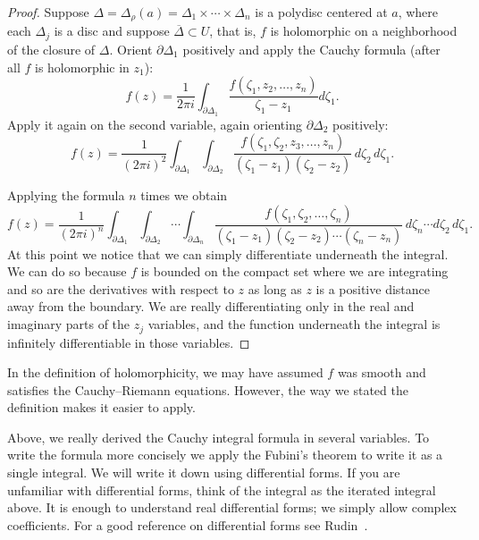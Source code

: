 \documentclass[12pt,openany]{book}
\theoremstyle{plain}
\theoremstyle{remark}
\theoremstyle{definition}
\theoremstyle{exercise}
\theoremstyle{example}
\begin{document}
\begin{proof}
Suppose $\Delta = \Delta_{\rho}(a) = \Delta_1 \times \cdots \times \Delta_n$
is a polydisc centered at $a$, where each $\Delta_j$ is a disc
and suppose $\overline{\Delta} \subset U$, that is, $f$ is holomorphic
on a neighborhood of the closure of $\Delta$.
Orient $\partial \Delta_1$ positively and
apply the Cauchy formula (after all $f$ is holomorphic in $z_1$):
\begin{equation*}
f(z) =
\frac{1}{2\pi i}
\int_{\partial \Delta_1}
\frac{f(\zeta_1,z_2,\ldots,z_n)}{\zeta_1-z_1}
d \zeta_1 .
\end{equation*}
Apply it again on the second variable, again orienting
$\partial \Delta_2$ positively:
\begin{equation*}
f(z) =
\frac{1}{{(2\pi i)}^2}
\int_{\partial \Delta_1}
\int_{\partial \Delta_2}
\frac{f(\zeta_1,\zeta_2,z_3,\ldots,z_n)}{(\zeta_1-z_1)(\zeta_2-z_2)}
\,
d \zeta_2
\,
d \zeta_1 .
\end{equation*}

Applying the formula $n$ times we obtain
\begin{equation*}
f(z) =
\frac{1}{{(2\pi i)}^n}
\int_{\partial \Delta_1}
\int_{\partial \Delta_2}
\cdots
\int_{\partial \Delta_n}
\frac{f(\zeta_1,\zeta_2,\ldots,\zeta_n)}{(\zeta_1-z_1)(\zeta_2-z_2)\cdots(\zeta_n-z_n)}
\,
d \zeta_n
\cdots
d \zeta_2
\,
d \zeta_1 .
\end{equation*}
At this point we notice that we can simply differentiate underneath the
integral.  We can do so because $f$ is bounded on the compact set where we
are integrating and so are the derivatives with respect to $z$ as long as
$z$ is a positive distance away from the boundary.
We are really differentiating only in the real and imaginary
parts of the $z_j$ variables, and the function underneath the integral is
infinitely differentiable in those variables.
\end{proof}

In the definition of holomorphicity,
we may have assumed $f$ was smooth and satisfies
the Cauchy--Riemann equations.  However, the way we stated the
definition makes it easier to apply.

Above, we really derived the Cauchy integral formula in several variables.  To
write the formula more concisely we apply the Fubini's theorem to write it as
a single integral.  We will write it down using differential forms.  If you
are unfamiliar with differential forms, think of the integral
as the iterated integral above.
It is enough to understand real differential forms; we simply allow
complex coefficients.
For a good reference on differential forms
see Rudin~\cite{Rudin:principles}.
\end{document}
